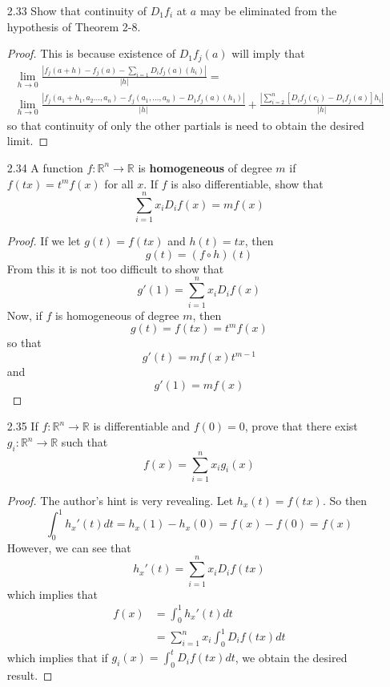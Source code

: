 \begin{enumerate}
    \item[2.33] Show that continuity of \( D_1f_i \) at \( a \) may be eliminated from the hypothesis of Theorem 2-8.
    
    \begin{proof}
    This is because existence of \( D_1f_j(a) \) will imply that
    \begin{multline*}
    \lim_{h\rightarrow 0} \frac{\left| f_j(a+h) - f_j(a) - \sum_{i=1} D_if_j(a)(h_i) \right|}{\left| h \right|} = \\ \lim_{h \rightarrow 0} \frac{\left| f_j(a_1+h_1,a_2\ldots,a_n)-f_j(a_1,\ldots,a_n)-D_1f_j(a)(h_1) \right|}{\left| h \right|} + \frac{\left| \sum_{i=2}^n [D_if_j(c_i)-D_if_j(a)] h_i \right|}{\left| h \right|}
    \end{multline*}
    so that continuity of only the other partials is need to obtain the desired limit.
    \end{proof}
    
    \item[2.34] A function \( f: \mathbb{R}^n \rightarrow \mathbb{R} \) is \textbf{homogeneous} of degree \( m \) if \( f(tx)=t^mf(x) \) for all \( x \). If \( f \) is also differentiable, show that
    \[
    \sum_{i=1}^n x_iD_if(x) = mf(x)
    \]
    
    \begin{proof}
    If we let \( g(t) = f(tx) \) and \( h(t) = tx \), then 
    \[
    g(t) = (f \circ h)(t)
    \]
    From this it is not too difficult to show that
    \[
    g'(1) = \sum_{i=1}^n x_iD_if(x)
    \]
    Now, if \( f \) is homogeneous of degree \( m \), then
    \[
    g(t) = f(tx) = t^mf(x)
    \]
    so that
    \[
    g'(t) = m f(x) t^{m-1}
    \]
    and
    \[
    g'(1) = mf(x)
    \]
    \end{proof}
    
    \item[2.35] If \( f: \mathbb{R}^n \rightarrow \mathbb{R} \) is differentiable and \( f(0) = 0 \), prove that there exist \( g_i:\mathbb{R}^n \rightarrow \mathbb{R} \) such that
    \[
    f(x) = \sum_{i=1}^n x_ig_i(x)
    \]
    
    \begin{proof}
    The author's hint is very revealing. Let \( h_x(t) = f(tx) \). So then
    \[
    \int_0^1 h_x'(t)dt = h_x(1) - h_x(0) = f(x) - f(0) = f(x)
    \]
    However, we can see that
    \[
    h_x'(t) = \sum_{i=1}^n x_iD_if(tx) 
    \]
    which implies that
    \begin{align*}
        f(x) &= \int_0^1 h_x'(t)dt \\
        &= \sum_{i=1}^n x_i \int_0^1 D_if(tx)dt
    \end{align*}
    which implies that if \( g_i(x) = \int_0^t D_if(tx)dt \), we obtain the desired result.
    \end{proof}


\end{enumerate}
